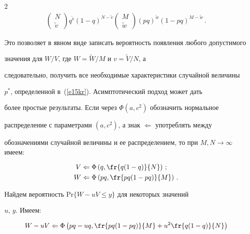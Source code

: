 \begin{multicols}{2}
\begin{multline*}
\begin{pmatrix}
     N\\


     \widetilde{v}


     \end{pmatrix} q^{\widetilde{v}}\left (1-q\right ) ^{N-\widetilde{v}}


     \begin{pmatrix}


     M\\ \widetilde{w}


     \end{pmatrix}


     \left ( pq\right )^{\widetilde{w}}\left (1-pq\right )^{M-\widetilde{w}}\,.


     \end{multline*}


Это позволяет в явном виде записать вероятность появления любого допустимого 


значения для $W/V$, где $W = \widetilde{W}/M$ и $v=\widetilde{V}/N$, а 


следовательно, получить все необходимые характеристики случайной величины 


$p^*$, определенной в~(\ref{e15kr}). Асимптотический подход может дать 


более простые результаты. Если через $\Phi (a,c^2)$ обозначить нормальное 


распределение с параметрами $(a,c^2)$, а знак $\Leftarrow$ упо\-треб\-лять между 


обозначениями случайной величины и ее распределением, то при $M,N\rightarrow 


\infty$ имеем: 


\begin{align*}


V & \Leftarrow \Phi\left (q, \fr{q(1-q)}{N}\right )\,;\\


W & \Leftarrow \Phi\left ( pq, \fr{pq(1-pq)}{M}\right )\,.


\end{align*} 


     


     Найдем вероятность $\mathrm{Pr}\{W-uV\leq y\}$ для некоторых значений 


$u$,  $y$. Имеем: 


     $$


     W-uV\Leftarrow \Phi\left ( pq-uq,\fr{pq(1-pq)}{M}+u^2\fr{q(1-q)}{N}\right )


     $$



\end{multicols}
